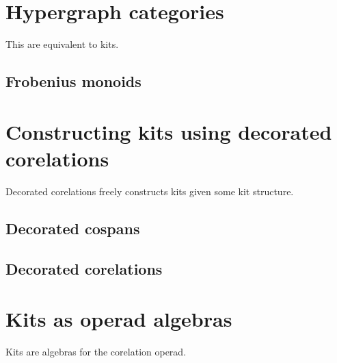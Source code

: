\documentclass{article}
\theoremstyle{remark}
\begin{document}
\section{Hypergraph categories}

This are equivalent to kits.
\subsection{Frobenius monoids}

\section{Constructing kits using decorated corelations}
Decorated corelations freely constructs kits given some kit structure.
\subsection{Decorated cospans}

\subsection{Decorated corelations}

\section{Kits as operad algebras}
Kits are algebras for the corelation operad.
\end{document}
